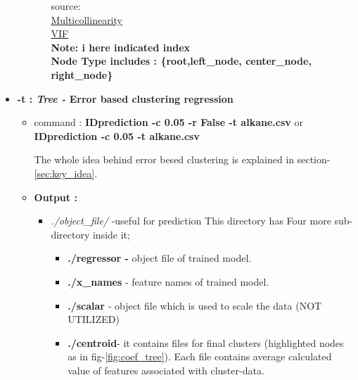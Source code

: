 \documentclass[12pt]{article}
\begin{document}
\begin{itemize}[wide = 0pt, labelwidth = 1.3333em, labelsep = 0.3333em, leftmargin = \dimexpr{} + \relax ]
\begin{itemize}
\begin{itemize}
					source: \\
					\href{https://statisticalhorizons.com/multicollinearity}{Multicollinearity}\\  \href{https://www.statsmodels.org/stable/generated/statsmodels.stats.outliers\_influence.variance\_inflation\_factor.html}{VIF} \\
					
					\textbf{Note: i here indicated index\\
						Node Type includes : \{root,left\_node, center\_node, right\_node\}}

				\end{itemize}
			
				
			\end{itemize}
			
			\newpage
			
			\item \textbf{-t : \textit{Tree -} Error based clustering  regression } 
			\begin{itemize}

				\item command : \textbf{IDprediction -c 0.05 -r False -t alkane.csv} 
				\subsubitem \hspace{0.5cm} or \textbf{IDprediction -c 0.05 -t alkane.csv} 
				
				\subitem The whole idea behind error besed clustering is explained in section-\ref{sec:key_idea}. 
				
				\item \textbf{Output :}
				\begin{itemize}
					\item \textit{ ./object\_file/} -useful for prediction 
					\subitem  This directory has Four more sub-directory inside it;
					\begin{itemize}
						\item \textbf{./regressor -} object file of trained model.
						
						\item \textbf{./x\_names} - feature names of trained model. 
						
						\item \textbf{./scalar} - object file which is used to scale the data (NOT UTILIZED) 
						
					  \item 	\textbf{./centroid}- it contains files for final clusters (highlighted nodes as in fig-\ref{fig:coef_tree}). Each file contains average calculated value of features associated with cluster-data. \\
					\end{itemize} 
					

\end{itemize}
\end{itemize}
\end{itemize}
\end{document}
